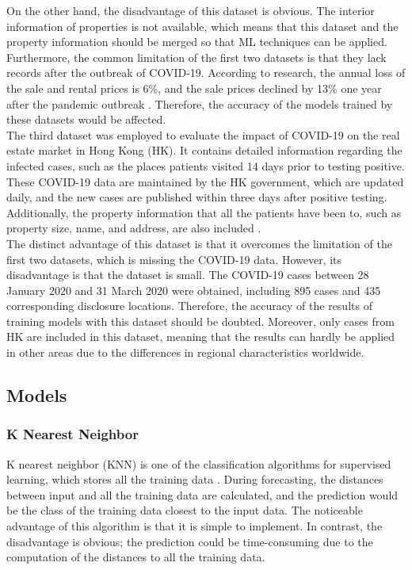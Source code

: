 \documentclass[12pt,twoside]{report}
\begin{document}
On the other hand, the disadvantage of this dataset is obvious. The interior information of properties is not available, which means that this dataset and the property information should be merged so that ML techniques can be applied. Furthermore, the common limitation of the first two datasets is that they lack records after the outbreak of COVID-19. According to research, the annual loss of the sale and rental prices is 6\%, and the sale prices declined by 13\% one year after the pandemic outbreak \citep{RN29}. Therefore, the accuracy of the models trained by these datasets would be affected. 
\\

The third dataset was employed to evaluate the impact of COVID-19 on the real estate market in Hong Kong (HK). It contains detailed information regarding the infected cases, such as the places patients visited 14 days prior to testing positive. These COVID-19 data are maintained by the HK government, which are updated daily, and the new cases are published within three days after positive testing. Additionally, the property information that all the patients have been to, such as property size, name, and address, are also included \citep{RN24}.
\\ 

The distinct advantage of this dataset is that it overcomes the limitation of the first two datasets, which is missing the COVID-19 data. However, its disadvantage is that the dataset is small. The COVID-19 cases between 28 January 2020 and 31 March 2020 were obtained, including 895 cases and 435 corresponding disclosure locations. Therefore, the accuracy of the results of training models with this dataset should be doubted. Moreover, only cases from HK are included in this dataset, meaning that the results can hardly be applied in other areas due to the differences in regional characteristics worldwide. 

\subsection{Models}
\label{model_review}
\subsubsection{K Nearest Neighbor}
K nearest neighbor (KNN) is one of the classification algorithms for supervised learning, which stores all the training data \citep{RN33}. During forecasting, the distances between input and all the training data are calculated, and the prediction would be the class of the training data closest to the input data. The noticeable advantage of this algorithm is that it is simple to implement. In contrast, the disadvantage is obvious; the prediction could be time-consuming due to the computation of the distances to all the training data. 
\end{document}
